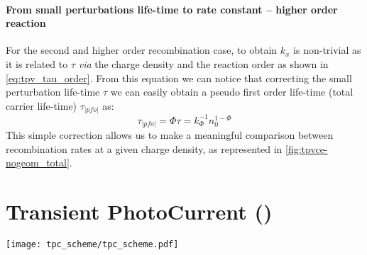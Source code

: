 \paragraph{From small perturbations life-time to rate constant -- higher order reaction}
For the second and higher order recombination case, to obtain $k_x$ is non-trivial as it is related to $\tau$ \textsl{via} the charge density \cite{ORegan2007} and the reaction order \cite{Shuttle2008,Du2018,Barnes2011,Barnes2011a} as shown in \cref{eq:tpv_tau_order}.
From this equation we can notice that correcting the small perturbation life-time $\tau$ we can easily obtain a pseudo first order life-time (total carrier life-time) $\tau_|pfo|$ as:
\begin{equation}
\tau_|pfo| = \Phi \tau = k_\Phi^{-1} n_0^{1-\Phi}
\end{equation}
This simple correction allows us to make a meaningful comparison between recombination rates at a given charge density, as represented in \cref{fig:tpvce-nogeom_total}.

\FloatBarrier
\newpage
\section{Transient PhotoCurrent ()}\label{characterization_tpc}

\begin{SCfigure}
	\centering
	\texttt{[image: tpc\_scheme/tpc\_scheme.pdf]}
	\label{fig:tpc_scheme}
\end{SCfigure}

